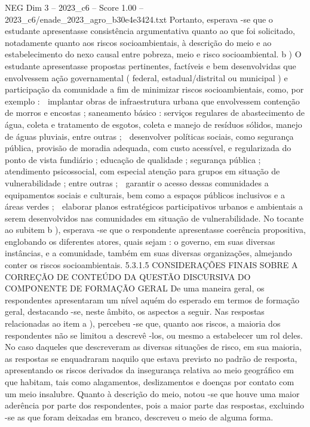 \begin{textsample}{NEG Dim 3 – 2023\_c6 – Score 1.00 – 2023\_c6/enade\_2023\_agro\_b30e4e3424.txt}
Portanto, esperava -se que o estudante apresentasse consistência argumentativa quanto ao que foi solicitado, notadamente quanto aos riscos socioambientais, à descrição do meio e ao estabelecimento do nexo causal entre pobreza, meio e risco socioambiental. b ) O estudante apresentasse propostas pertinentes, factíveis e bem desenvolvidas que envolvessem ação governamental ( federal, estadual/distrital ou municipal ) e participação da comunidade a fim de minimizar riscos socioambientais, como, por exemplo :  implantar obras de infraestrutura urbana que envolvessem contenção de morros e encostas ; saneamento básico : serviços regulares de abastecimento de água, coleta e tratamento de esgotos, coleta e manejo de resíduos sólidos, manejo de águas pluviais, entre outras ;  desenvolver políticas sociais, como segurança pública, provisão de moradia adequada, com custo acessível, e regularizada do ponto de vista fundiário ; educação de qualidade ; segurança pública ; atendimento psicossocial, com especial atenção para grupos em situação de vulnerabilidade ; entre outras ;  garantir o acesso dessas comunidades a equipamentos sociais e culturais, bem como a espaços públicos inclusivos e a áreas verdes ;  elaborar planos estratégicos participativos urbanos e ambientais a serem desenvolvidos nas comunidades em situação de vulnerabilidade.
No tocante ao subitem b ), esperava -se que o respondente apresentasse coerência propositiva, englobando os diferentes atores, quais sejam : o governo, em suas diversas instâncias, e a comunidade, também em suas diversas organizações, almejando conter os riscos socioambientais. 5.3.1.5 CONSIDERAÇÕES FINAIS SOBRE A CORREÇÃO DE CONTEÚDO DA QUESTÃO DISCURSIVA DO COMPONENTE DE FORMAÇÃO GERAL De uma maneira geral, os respondentes apresentaram um nível aquém do esperado em termos de formação geral, destacando -se, neste âmbito, os aspectos a seguir.
Nas respostas relacionadas ao item a ), percebeu -se que, quanto aos riscos, a maioria dos respondentes não se limitou a descrevê -los, ou mesmo a estabelecer um rol deles.
No caso daqueles que descreveram as diversas situações de risco, em sua maioria, as respostas se enquadraram naquilo que estava previsto no padrão de resposta, apresentando os riscos derivados da insegurança relativa ao meio geográfico em que habitam, tais como alagamentos, deslizamentos e doenças por contato com um meio insalubre.
Quanto à descrição do meio, notou -se que houve uma maior aderência por parte dos respondentes, pois a maior parte das respostas, excluindo -se as que foram deixadas em branco, descreveu o meio de alguma forma.

\end{textsample}
